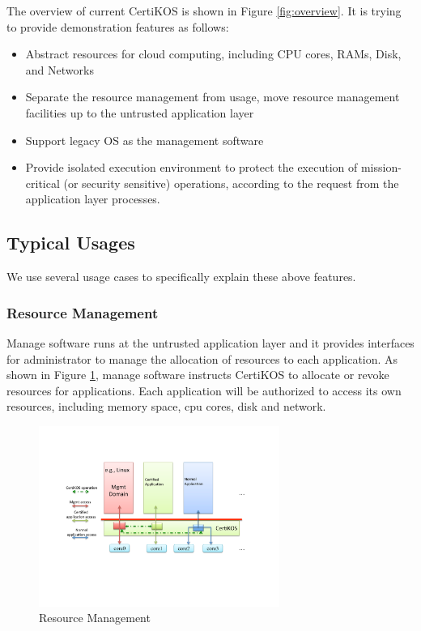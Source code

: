 \documentclass[a4paper,12pt]{article}
\begin{document}
The overview of current CertiKOS  is shown in Figure \ref{fig:overview}.  It is trying to provide demonstration features as follows:  
\begin{itemize}
\item  Abstract resources for cloud computing, including CPU cores, RAMs, Disk, and Networks
\item  Separate the resource management from usage, move resource management facilities up to the untrusted application layer
\item  Support legacy OS as the management software
\item  Provide isolated execution environment to protect the execution of mission-critical (or security sensitive) operations,  according to the request from the application layer processes.
\end{itemize}

\subsection{Typical Usages }
We use several usage cases to specifically explain these above features. 

\subsubsection{Resource Management} 
Manage software runs at the untrusted application layer and it provides interfaces for administrator to manage the allocation of resources to each application.  As shown in Figure \ref{fig:resourcemgmt}, manage software instructs  CertiKOS to allocate  or revoke resources for applications.   Each application will be authorized to access its own resources, including memory space, cpu cores, disk and network.  
\begin{figure}[!ht]
 \centerline{
 \includegraphics[width=0.7\textwidth]{certikos_resource_mgmt}}
 \caption{Resource Management} \label{fig:resourcemgmt}
\end{figure}
\end{document}
